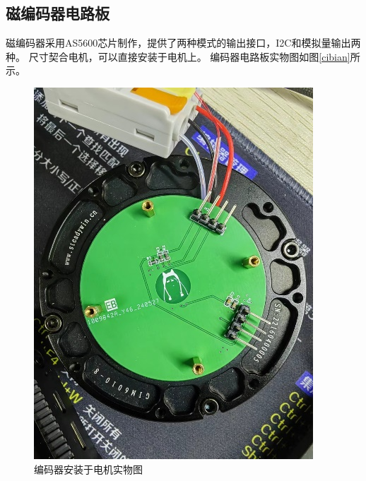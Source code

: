 ﻿\documentclass[12pt,a4paper]{article}
\begin{document}
\subsection{磁编码器电路板}
磁编码器采用AS5600芯片制作，提供了两种模式的输出接口，I2C和模拟量输出两种。
尺寸契合电机，可以直接安装于电机上。
编码器电路板实物图如图\ref{cibian}所示。
\begin{figure}[htbp]
  \centering
  \begin{minipage}{0.3\linewidth}
    \centering
    \includegraphics[width=\linewidth]{picture/编码器1.png}
    \caption{编码器安装于电机实物图}
  \end{minipage}
  \begin{minipage}{0.3\linewidth}
    \centering

\end{minipage}
\end{figure}
\end{document}
